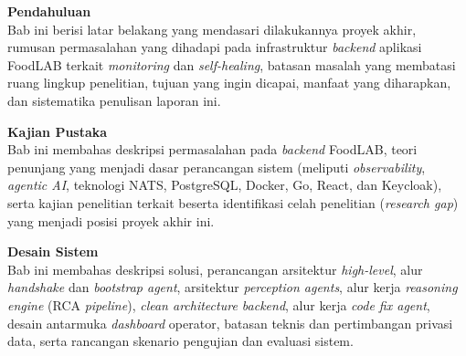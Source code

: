 
\vspace{0.3cm}
\begin{description}[leftmargin=2.2cm, labelsep=0cm, itemsep=0.1cm]
  \item[{\makebox[2.2cm][l]{\textbf{Bab 1}}}] \textbf{Pendahuluan}\\
    Bab ini berisi latar belakang yang mendasari dilakukannya proyek akhir, rumusan permasalahan yang dihadapi pada infrastruktur \textit{backend} aplikasi FoodLAB terkait \textit{monitoring} dan \textit{self-healing}, batasan masalah yang membatasi ruang lingkup penelitian, tujuan yang ingin dicapai, manfaat yang diharapkan, dan sistematika penulisan laporan ini.

  \item[{\makebox[2.2cm][l]{\textbf{Bab 2}}}] \textbf{Kajian Pustaka}\\
    Bab ini membahas deskripsi permasalahan pada \textit{backend} FoodLAB, teori penunjang yang menjadi dasar perancangan sistem (meliputi \textit{observability}, \textit{agentic AI}, teknologi NATS, PostgreSQL, Docker, Go, React, dan Keycloak), serta kajian penelitian terkait beserta identifikasi celah penelitian (\textit{research gap}) yang menjadi posisi proyek akhir ini.

  \item[{\makebox[2.2cm][l]{\textbf{Bab 3}}}] \textbf{Desain Sistem}\\
    Bab ini membahas deskripsi solusi, perancangan arsitektur \textit{high-level}, alur \textit{handshake} dan \textit{bootstrap agent}, arsitektur \textit{perception agents}, alur kerja \textit{reasoning engine} (RCA \textit{pipeline}), \textit{clean architecture backend}, alur kerja \textit{code fix agent}, desain antarmuka \textit{dashboard} operator, batasan teknis dan pertimbangan privasi data, serta rancangan skenario pengujian dan evaluasi sistem.
\end{description}
